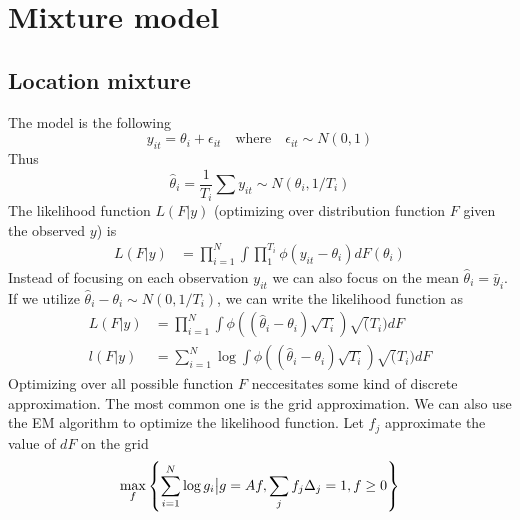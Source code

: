 \section{Mixture model}

\subsection{Location mixture}
The model is the following
\begin{equation*}
    y_{it}=\theta_i+\epsilon_{it} \quad \text{where} \quad \epsilon_{it}\sim N(0,1)
\end{equation*}
Thus \begin{equation*}
    \hat{\theta}_i=\frac{1}{T_i}\sum y_{it} \sim N(\theta_i,1/T_i)
\end{equation*}
The likelihood function $L(F|y)$ (optimizing over distribution function $F$ given the observed $y$) is
\begin{equation*}
    \begin{split}
        L(F|y)&=\prod_{i=1}^N\int \prod_{1}^{T_i} \phi(y_{it}-\theta_i)dF(\theta_i)
    \end{split}
\end{equation*}
Instead of focusing on each observation $y_{it}$ we can also focus on the mean $\hat{\theta}_i=\bar{y}_i$.
If we utilize $\hat{\theta}_i-\theta_i \sim N(0,1/T_i)$, we can write the likelihood function as \begin{align*}
    L(F|y) & =\prod_{i=1}^N\int
    \phi((\hat{\theta}_i-\theta_i)\sqrt{T_i})\sqrt(T_i)dF \\
    l(F|y) & =\sum_{i=1}^N\log\int
    \phi((\hat{\theta}_i-\theta_i)\sqrt{T_i})\sqrt(T_i)dF
\end{align*}
Optimizing over all possible function $F$ neccesitates some kind of discrete approximation. The most common one is the grid approximation. We can also use the EM algorithm to optimize the likelihood function.
Let $f_j$ approximate the value of $d F$ on the grid
\begin{equation*}
    \max_f \left\{ \sum_{i=1}^N\log g_i \big| g=Af, \sum_j f_j\Delta_j =1, f\ge 0\right\}
\end{equation*}

